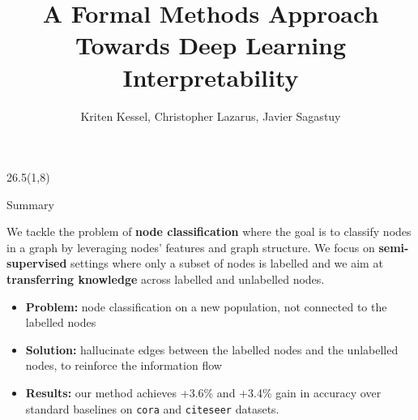 \documentclass[final]{beamer}
\title{A Formal Methods Approach Towards Deep Learning Interpretability}
\author{Kriten Kessel, Christopher Lazarus, Javier Sagastuy}
\institute{Stanford University}
\begin{document}
\newcommand{\vltbl}{{\color{tbllinecolor}\vrule}}


\begin{frame}[fragile]{}

%

\newcommand{\vstart}{58} %
\newcommand{\vstartCols}{8} %
\newcommand{\fullwidth}{81}  %
\newcommand{\colwidth}{26.5}

\newcommand{\firstcolpos}{1}
\newcommand{\secondcolpos}{28.75}
\newcommand{\thirdcolpos}{56.5}
\newcommand{\bottomblockstart}{108.5}


\newenvironment{paddedBlock}[2][0.95\linewidth]
    {\begin{block}{#2}\begin{minipage}{#1}}
    {\end{minipage}\end{block}}


\begin{textblock}{\colwidth}(\firstcolpos,\vstartCols)

\begin{paddedBlock}{Summary}
We tackle the problem of \textbf{node classification} where the goal is to classify nodes in a graph by leveraging nodes' features and graph structure.
We focus on \textbf{semi-supervised} settings where only a subset of nodes is labelled and we aim at \textbf{transferring knowledge} across labelled and unlabelled nodes. 
\begin{itemize}
\item \textbf{Problem:} node classification on a new population, not connected to the labelled nodes
\item \textbf{Solution:} hallucinate edges between the labelled nodes and the unlabelled nodes, to reinforce the information flow
\item \textbf{Results:} our method achieves +3.6\% and +3.4\% gain in accuracy over standard baselines on \texttt{cora} and \texttt{citeseer} datasets.
\end{itemize}
\end{paddedBlock}


\end{textblock}
\end{frame}
\end{document}
